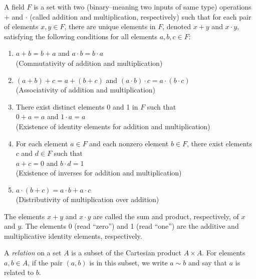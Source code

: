 \documentclass{article}
\begin{document}
\begin{definition}
A field \( F \) is a set with two (binary--meaning two inputs of same type) operations \( + \) and \( \cdot \) (called addition and multiplication, respectively) such that for each pair of elements \( x, y \in F \), there are unique elements in \( F \), denoted \( x + y \) and \( x \cdot y \), satisfying the following conditions for all elements \( a, b, c \in F \):
\begin{enumerate}[label=(\roman*)]
    \item \( a + b = b + a \) and \( a \cdot b = b \cdot a \) \\
    (Commutativity of addition and multiplication)
    
    \item \( (a + b) + c = a + (b + c) \) and \( (a \cdot b) \cdot c = a \cdot (b \cdot c) \) \\
    (Associativity of addition and multiplication)
    
    \item There exist distinct elements 0 and 1 in \( F \) such that \\
    \( 0 + a = a \) and \( 1 \cdot a = a \) \\
    (Existence of identity elements for addition and multiplication)
    
    \item For each element \( a \in F \) and each nonzero element \( b \in F \), there exist elements \( c \) and \( d \in F \) such that \\
    \( a + c = 0 \) and \( b \cdot d = 1 \) \\
    (Existence of inverses for addition and multiplication)
    
    \item \( a \cdot (b + c) = a \cdot b + a \cdot c \) \\
    (Distributivity of multiplication over addition)
\end{enumerate}
The elements \( x + y \) and \( x \cdot y \) are called the sum and product, respectively, of \( x \) and \( y \). The elements 0 (read “zero”) and 1 (read “one”) are the additive and multiplicative identity elements, respectively.
\end{definition}

\begin{definition}[Relation]
    A \emph{relation} on a set \( A \) is a subset of the Cartesian product \( A \times A \). For elements \( a, b \in A \), if the pair \( (a, b) \) is in this subset, we write \( a \sim b \) and say that \( a \) is related to \( b \).
\end{definition}
\end{document}
